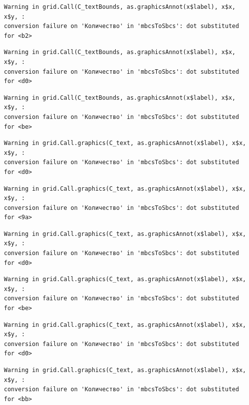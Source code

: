 \documentclass[
  letterpaper,
  DIV=11,
  numbers=noendperiod]{scrreprt}
\theoremstyle{definition}
\theoremstyle{remark}
\begin{document}
\begin{verbatim}
Warning in grid.Call(C_textBounds, as.graphicsAnnot(x$label), x$x, x$y, :
conversion failure on 'Количество' in 'mbcsToSbcs': dot substituted for <b2>
\end{verbatim}

\begin{verbatim}
Warning in grid.Call(C_textBounds, as.graphicsAnnot(x$label), x$x, x$y, :
conversion failure on 'Количество' in 'mbcsToSbcs': dot substituted for <d0>
\end{verbatim}

\begin{verbatim}
Warning in grid.Call(C_textBounds, as.graphicsAnnot(x$label), x$x, x$y, :
conversion failure on 'Количество' in 'mbcsToSbcs': dot substituted for <be>
\end{verbatim}

\begin{verbatim}
Warning in grid.Call.graphics(C_text, as.graphicsAnnot(x$label), x$x, x$y, :
conversion failure on 'Количество' in 'mbcsToSbcs': dot substituted for <d0>
\end{verbatim}

\begin{verbatim}
Warning in grid.Call.graphics(C_text, as.graphicsAnnot(x$label), x$x, x$y, :
conversion failure on 'Количество' in 'mbcsToSbcs': dot substituted for <9a>
\end{verbatim}

\begin{verbatim}
Warning in grid.Call.graphics(C_text, as.graphicsAnnot(x$label), x$x, x$y, :
conversion failure on 'Количество' in 'mbcsToSbcs': dot substituted for <d0>
\end{verbatim}

\begin{verbatim}
Warning in grid.Call.graphics(C_text, as.graphicsAnnot(x$label), x$x, x$y, :
conversion failure on 'Количество' in 'mbcsToSbcs': dot substituted for <be>
\end{verbatim}

\begin{verbatim}
Warning in grid.Call.graphics(C_text, as.graphicsAnnot(x$label), x$x, x$y, :
conversion failure on 'Количество' in 'mbcsToSbcs': dot substituted for <d0>
\end{verbatim}

\begin{verbatim}
Warning in grid.Call.graphics(C_text, as.graphicsAnnot(x$label), x$x, x$y, :
conversion failure on 'Количество' in 'mbcsToSbcs': dot substituted for <bb>
\end{verbatim}
\end{document}
